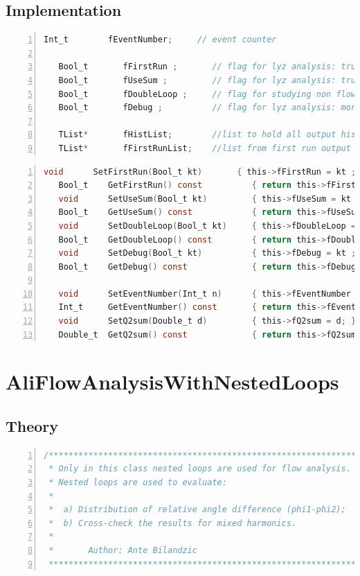 \documentclass[a4paper]{book}
\numberwithin{equation}{subsection}
\begin{document}
\subsection{Implementation}
\begin{lstlisting}[language=C, numbers=left]
   Int_t        fEventNumber;     // event counter
        
   Bool_t       fFirstRun ;       // flag for lyz analysis: true=first run over data, false=second run 
   Bool_t       fUseSum ;         // flag for lyz analysis: true=use sum gen.function, false=use product gen.function
   Bool_t       fDoubleLoop ;     // flag for studying non flow effects
   Bool_t       fDebug ;          // flag for lyz analysis: more print statements

   TList*       fHistList;        //list to hold all output histograms 
   TList*       fFirstRunList;    //list from first run output
\end{lstlisting}

\begin{lstlisting}[language=C, numbers=left]
   void      SetFirstRun(Bool_t kt)       { this->fFirstRun = kt ; }
   Bool_t    GetFirstRun() const          { return this->fFirstRun ; }
   void      SetUseSum(Bool_t kt)         { this->fUseSum = kt ; }
   Bool_t    GetUseSum() const            { return this->fUseSum ; }
   void      SetDoubleLoop(Bool_t kt)     { this->fDoubleLoop = kt ; }
   Bool_t    GetDoubleLoop() const        { return this->fDoubleLoop ; }
   void      SetDebug(Bool_t kt)          { this->fDebug = kt ; }
   Bool_t    GetDebug() const             { return this->fDebug ; }
   
   void      SetEventNumber(Int_t n)      { this->fEventNumber = n; }
   Int_t     GetEventNumber() const       { return this->fEventNumber; }
   void      SetQ2sum(Double_t d)         { this->fQ2sum = d; }
   Double_t  GetQ2sum() const             { return this->fQ2sum; }\end{lstlisting}


   \section{AliFlowAnalysisWithNestedLoops}
\subsection{Theory}
\begin{lstlisting}[language=C, numbers=left]
/*************************************************************** 
 * Only in this class nested loops are used for flow analysis. *
 * Nested loops are used to evaluate:                          *
 *                                                             *  
 *  a) Distribution of relative angle difference (phi1-phi2);  *
 *  b) Cross-check the results for mixed harmonics.            *
 *                                                             *
 *       Author: Ante Bilandzic                                *
 ***************************************************************/ \end{lstlisting}
\end{document}
